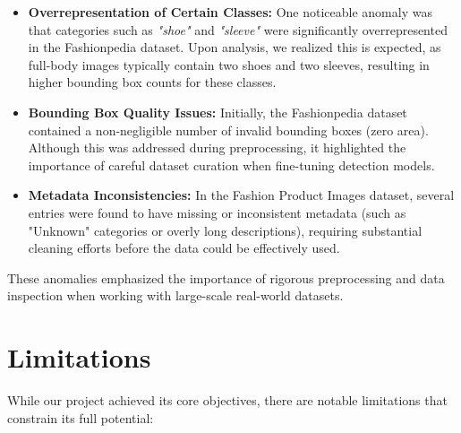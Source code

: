 \begin{itemize}
    \item \textbf{Overrepresentation of Certain Classes:} One noticeable anomaly was that categories such as \textit{"shoe"} and \textit{"sleeve"} were significantly overrepresented in the Fashionpedia dataset. Upon analysis, we realized this is expected, as full-body images typically contain two shoes and two sleeves, resulting in higher bounding box counts for these classes.

    \item \textbf{Bounding Box Quality Issues:} Initially, the Fashionpedia dataset contained a non-negligible number of invalid bounding boxes (zero area). Although this was addressed during preprocessing, it highlighted the importance of careful dataset curation when fine-tuning detection models.

    \item \textbf{Metadata Inconsistencies:} In the Fashion Product Images dataset, several entries were found to have missing or inconsistent metadata (such as "Unknown" categories or overly long descriptions), requiring substantial cleaning efforts before the data could be effectively used.
\end{itemize}

These anomalies emphasized the importance of rigorous preprocessing and data inspection when working with large-scale real-world datasets.

\section{Limitations}

While our project achieved its core objectives, there are notable limitations that constrain its full potential:

